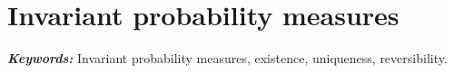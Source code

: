 \documentclass[english,graybox,envcountchap,envcountsame,sectrefs,shortlabels]{svmono}
\theoremstyle{style}
\renewenvironment{keywords}{\textit{\bf Keywords: } \sffamily }{}
\begin{document}
%
%
%
%
%
%
%

\chapter{Invariant probability measures}
\minitoc
\begin{keywords}
Invariant probability measures, existence, uniqueness, reversibility.
\end{keywords}
\end{document}

